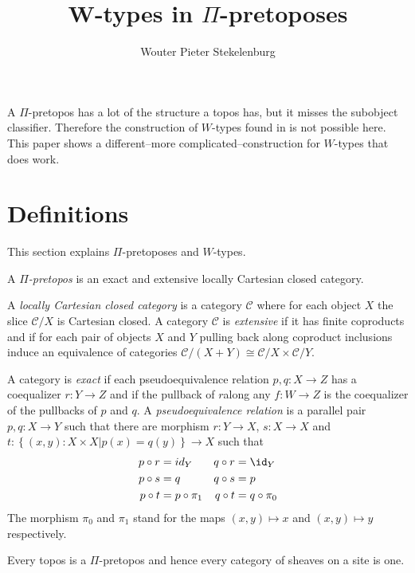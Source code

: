 \documentclass{tac}
\title{W-types in $\Pi$-pretoposes}
\author{Wouter Pieter Stekelenburg}\copyrightyear{2015}
\newcommand\hide[1]{}
\newcommand\cat\mathcal
\newcommand\set[1]{\left\{#1\right\}}
\newcommand\of:
\begin{document}
\maketitle


A $\Pi$-pretopos has a lot of the structure a topos has, but it misses the subobject classifier. Therefore the construction of $W$-types found in \hide{cite Moerdijk, van der Berg} is not possible here. This paper shows a different--more complicated--construction for $W$-types that does work.

\section{Definitions}%
This section explains $\Pi$-pretoposes and $W$-types.

\newcommand\bieq{\cong}
\begin{definition}[$\Pi$-pretopos] A \emph{$\Pi$-pretopos} is an exact and extensive locally Cartesian closed category. 

A \emph{locally Cartesian closed category} is a category $\cat C$ where for each object $X$ the slice $\cat C/X$ is Cartesian closed.
A category $\cat C$ is \emph{extensive} if it has finite coproducts and if for each pair of objects $X$ and $Y$ pulling back along coproduct inclusions induce an equivalence of categories $\cat C/(X+Y)\bieq\cat C/X\times \cat C/Y$. 

A category is \emph{exact} if each pseudoequivalence relation $p,q\of X\to Z$ has a coequalizer $r\of Y\to Z$ and if the pullback of $r$along any $f\of W\to Z$ is the coequalizer of the pullbacks of $p$ and $q$. 
A \emph{pseudoequivalence relation} is a parallel pair $p,q\of X\to Y$ such that there are morphism $r\of Y\to X$, $s\of X\to X$ and $t\of \set{(x,y)\of X\times X|p(x)=q(y)}\to X$ such that
\begin{align*}
p\circ r&=id_Y & q\circ r&=\id_Y\\
p\circ s&=q & q\circ s&=p\\
p\circ t&=p\circ \pi_1 & q\circ t&=q\circ \pi_0
\end{align*}
The morphism $\pi_0$ and $\pi_1$ stand for the maps $(x,y)\mapsto x$ and $(x,y)\mapsto y$ respectively.
\end{definition}

\begin{example} Every topos is a $\Pi$-pretopos and hence every category of sheaves on a site is one. \end{example}
\end{document}

